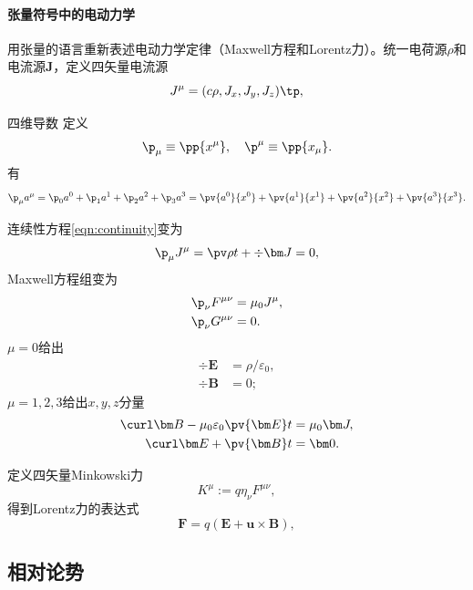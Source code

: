 \paragraph{张量符号中的电动力学}
用张量的语言重新表述电动力学定律（Maxwell方程和Lorentz力）。统一电荷源$\rho$和电流源$\bm J$，定义四矢量电流源
\begin{equation}
    J^\mu=(c\rho,J_x,J_y,J_z)\tp,
\end{equation}
\begin{definition}{四维导数}{}
    定义 
    \begin{equation}
        \p_\mu\equiv\pp{x^\mu},\quad\p^\mu\equiv\pp{x_\mu}.
    \end{equation}
    有
    \begin{equation}
        \p_\mu a^\mu=\p_0a^0+\p_1a^1+\p_2a^2+\p_3a^3=\pv{a^0}{x^0}+\pv{a^1}{x^1}+\pv{a^2}{x^2}+\pv{a^3}{x^3}.
    \end{equation}
\end{definition}
连续性方程\eqref{eqn:continuity}变为 
\[
    \p_\mu J^\mu=\pv\rho t+\div\bm J=0,
\]
Maxwell方程组变为 
\begin{subequations}
    \begin{align}
        \p_\nu F^{\mu\nu}&=\mu_0J^\mu,\\
        \p_\nu G^{\mu\nu}&=0.
    \end{align}
\end{subequations}
$\mu=0$给出 
\begin{subequations}
    \begin{align}
        \div\bm E&=\rho/\varepsilon_0,\\
        \div\bm B&=0;
    \end{align}
\end{subequations}
$\mu=1,2,3$给出$x,y,z$分量 
\begin{subequations}
    \begin{align}
        \curl\bm B-\mu_0\varepsilon_0\pv{\bm E}t&=\mu_0\bm J,\\
        \curl\bm E+\pv{\bm B}t&=\bm0.
    \end{align}
\end{subequations}

定义四矢量Minkowski力 
\begin{equation}
    K^\mu:=q\eta_\nu F^{\mu\nu},
\end{equation}
得到Lorentz力的表达式
\[
    \bm F=q(\bm E+\bm u\times\bm B),
\]

\subsection{相对论势}

